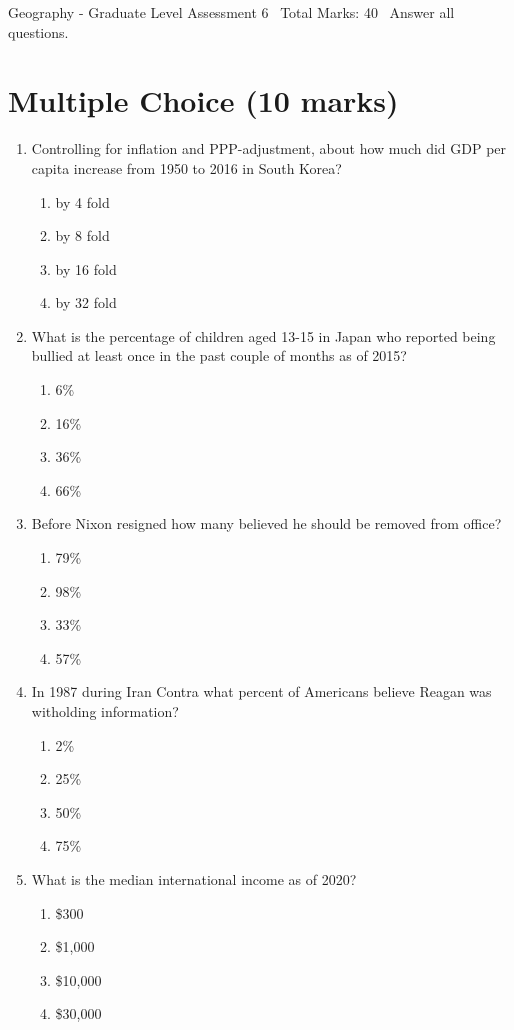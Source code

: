 \documentclass[12pt]{article}
\begin{document}
\begin{center}
Geography - Graduate Level Assessment 6 \
Total Marks: 40 \
Answer all questions.
\end{center}

\section*{Multiple Choice (10 marks)}
\begin{enumerate}[label=\arabic*.]
\item Controlling for inflation and PPP-adjustment, about how much did GDP per capita increase from 1950 to 2016 in South Korea?
\begin{enumerate}[label=(\alph*)]
    \item by 4 fold
    \item by 8 fold
    \item by 16 fold
    \item by 32 fold
\end{enumerate}
\item What is the percentage of children aged 13-15 in Japan who reported being bullied at least once in the past couple of months as of 2015?
\begin{enumerate}[label=(\alph*)]
    \item 6\%
    \item 16\%
    \item 36\%
    \item 66\%
\end{enumerate}
\item Before Nixon resigned how many believed he should be removed from office?
\begin{enumerate}[label=(\alph*)]
    \item 79\%
    \item 98\%
    \item 33\%
    \item 57\%
\end{enumerate}
\item In 1987 during Iran Contra what percent of Americans believe Reagan was witholding information?
\begin{enumerate}[label=(\alph*)]
    \item 2\%
    \item 25\%
    \item 50\%
    \item 75\%
\end{enumerate}
\item What is the median international income as of 2020?
\begin{enumerate}[label=(\alph*)]
    \item \$300
    \item \$1,000
    \item \$10,000
    \item \$30,000
\end{enumerate}
\end{enumerate}
\end{document}
